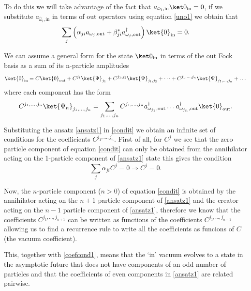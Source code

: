 To do this we will take advantage of the fact that  $a_{\hat\omega_i,\text{in}}\ket0_{\text{in}}=0$, if we substitute $a_{\hat\omega_i,\text{in}}$ in terms of out operators using equation \eqref{uno1} we obtain that
\begin{equation}\label{condit}
\sum_j \left(\alpha_{ji} a_{\omega_j,\text{out}}+\beta_{ji}^* a_{\omega_j,\text{out}}^\dagger\right)\ket{0}_\text{in}=0.
\end{equation}

 
We can assume a general form for the state $\ket0_{\text{in}}$ in terms of the out Fock basis as a sum of its n-particle amplitudes
\begin{equation}\label{ansatz1}
\ket{0}_{\text{in}}= C\ket{0}_{\text{out}}+C^{j_1}\ket{\Psi}_{j_1}+C^{j_1,j_2}\ket{\Psi}_{j_1,j_2}+\dots+C^{j_1,\dots,j_n}\ket{\Psi}_{j_1,\dots,j_n}+\dots
\end{equation}
where each component has the form
\begin{equation}
C^{j_1,\dots,j_n} \ket{\Psi_n}_{j_1,\dots,j_n}=\sum_{j_1,\dots,j_n} C^{j_1,\dots,j_n} a_{\omega_{j_1},\text{out}}^\dagger\dots a_{\omega_{j_n},\text{out}}^\dagger\ket{0}_\text{out}.
 \end{equation}
 

Substituting the ansatz \eqref{ansatz1} in \eqref{condit} we obtain an infinite set of conditions for the coefficients $C^{j_1,\dots,j_n}$. First of all, for $C^{j}$ we see that the zero particle component of equation \eqref{condit}  can only be obtained from the annihilator acting on the 1-particle component of \eqref{ansatz1} state this gives the condition
\begin{equation}\label{coefcond1}
\sum_j\alpha_{j i}C^j=0\Rightarrow C^j= 0.
\end{equation} 

Now, the $n$-particle component ($n>0$) of equation \eqref{condit} is obtained by the annihilator acting  on the $n+1$ particle component of \eqref{ansatz1} and the creator acting on the $n-1$ particle component of \eqref{ansatz1}, therefore we know that the coefficients $C^{j_1,\dots,j_{n+1}}$ can be written as functions of the coefficients $C^{j_1,\dots,j_{n-1}}$ allowing us to find a recurrence rule to write all the coefficients as funcions of $C$ (the vacuum coefficient).

This, together with \eqref{coefcond1}, means that the `in' vacuum evolves to a state in the asymptotic future that does not have components of an odd number of particles and that the coefficients of even components in \eqref{ansatz1} are related pairwise. 

